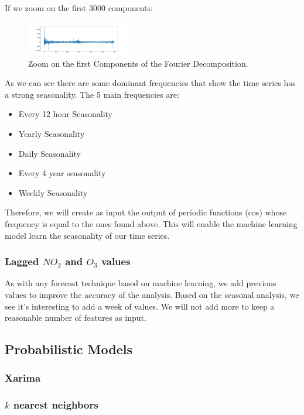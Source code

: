 \documentclass[a4paper,twocolumn,5p]{elsarticle}
\begin{document}
If we zoom on the first 3000 components:

\begin{figure}
  \caption{Zoom on the first Components of the Fourier Decomposition.}
  \centering
  \includegraphics[width=0.4\textwidth]{decompositionzoom}
\end{figure}

As we can see there are some dominant frequencies that show the time series has a strong seasonality. The 5 main 
frequencies are:

\begin{itemize}
  \item Every 12 hour Seasonality
  \item Yearly Seasonality
  \item Daily Seasonality
  \item Every 4 year seasonality
  \item Weekly Seasonality
\end{itemize} 

Therefore, we will create as input the output of periodic functions (cos) whose frequency is equal to the ones found 
above. This will enable the machine learning model learn the seasonality of our time series.

\subsubsection{Lagged $NO_2$ and $O_3$ values}

As with any forecast technique based on machine learning, we add previous values to improve the accuracy 
of the analysis. Based on the seasonal analysis, we see it's interesting to add a week of values. We will not 
add more to keep a reasonable number of features as input.

\subsection{Probabilistic Models}
\label{sec:models}

\subsubsection{Xarima}

\subsubsection{$k$ nearest neighbors}
\end{document}
